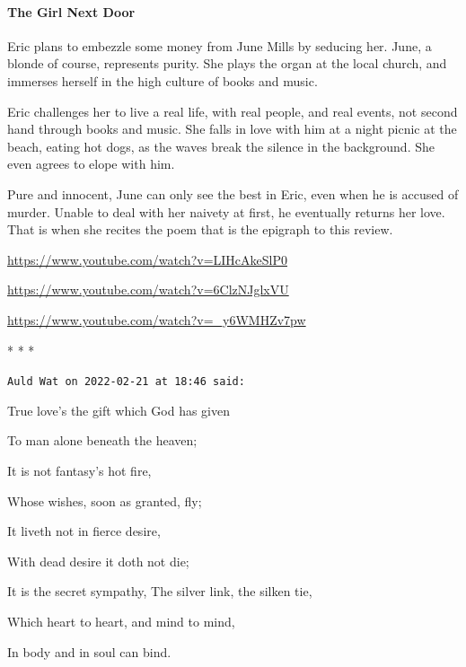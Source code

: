 \paragraph{The Girl Next Door}


Eric plans to embezzle some money from June Mills by seducing her. June, a blonde of course, represents purity. She plays the organ at the local church, and immerses herself in the high culture of books and music.

Eric challenges her to live a real life, with real people, and real events, not second hand through books and music. She falls in love with him at a night picnic at the beach, eating hot dogs, as the waves break the silence in the background. She even agrees to elope with him.

Pure and innocent, June can only see the best in Eric, even when he is accused of murder. Unable to deal with her naivety at first, he eventually returns her love. That is when she recites the poem that is the epigraph to this review.

\url{https://www.youtube.com/watch?v=LIHcAkeSlP0}

\url{https://www.youtube.com/watch?v=6ClzNJglxVU}

\url{https://www.youtube.com/watch?v=\_y6WMHZv7pw}


\begin{center}* * *\end{center}

\begin{footnotesize}
\begin{sffamily}
\texttt{Auld Wat on 2022-02-21 at 18:46 said:}

True love's the gift which God has given

To man alone beneath the heaven; 

It is not fantasy's hot fire, 

Whose wishes, soon as granted, fly; 

It liveth not in fierce desire, 

With dead desire it doth not die; 


It is the secret sympathy, 
The silver link, the silken tie, 

Which heart to heart, and mind to mind, 

In body and in soul can bind.
\end{sffamily}
\end{footnotesize}
